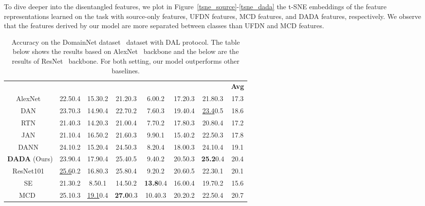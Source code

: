 \documentclass{article}
\newcommand{\BU}[1]{\color{black!40!green}\textbf{#1}}
\newcommand{\BV}[1]{\color{black!10!blue}{\em #1}}
\begin{document}
To dive deeper into the disentangled features, we plot in Figure~\ref{tsne_source}-\ref{tsne_dada} the t-SNE embeddings of the feature representations learned on the {\BV{sv}}{\BV{mm,mt,up,sy}} task with source-only features, UFDN features, MCD features, and DADA features, respectively. We observe that the features derived by our model are more separated between classes than UFDN and MCD features. 







\begin{table*}[t]
\vspace{-0.3cm}
\caption{Accuracy on the DomainNet dataset~\cite{domainnet} dataset with DAL protocol. The table below shows the results based on AlexNet~\cite{alexnet} backbone and the below are the results of ResNet~\cite{resnet} backbone. For both setting, our model outperforms other baselines. } \label{table_lsdac}
\vspace{0.1in}
\centering
\small
{
\begin{tabular}{c c c c c c  c c}
\Xhline{1.0pt}
 & 
\multirow{2}{1.4cm}{\scriptsize{\BV{clpinf,pnt\\qdr,rel,skt}} } &  
\multirow{2}{1.4cm}{\scriptsize{\BV{infclp,pnt,\\qdr,rel,skt}} } & 
\multirow{2}{1.4cm}{\scriptsize{\BV{pntclp,inf,\\qdr,rel,skt}} }& 
\multirow{2}{1.4cm}{\scriptsize{\BV{qdrclp,inf,\\pnt,rel,skt}} }&    
\multirow{2}{1.4cm}{\scriptsize{\BV{relclp,inf,\\pnt,qdr,skt }} } & 
\multirow{2}{1.4cm}{\scriptsize{\BV{sktclp,inf,\\pnt,qdr,rel }} } & 
\multirow{2}{0.5cm}{{\BU{Avg}}} \\ 
&&&&&&& \\




 \Xhline{0.7pt} 
AlexNet~\cite{alexnet}& 22.50.4&15.30.2&21.20.3&6.00.2&17.20.3&21.80.3& 17.3\\
DAN~\cite{long2015} & 23.70.3 & 14.90.4 & 22.70.2 & 7.60.3& 19.40.4&\underline{23.4}0.5 & 18.6 \\
RTN~\cite{RTN} & 21.40.3 & 14.20.3 & 21.00.4 & 7.70.2 & 17.80.3 &20.80.4  &17.2\\
JAN~\cite{JAN} &21.10.4&16.50.2&21.60.3&9.90.1&15.40.2&22.50.3&17.8\\
DANN~\cite{DANN}&24.10.2 & 15.20.4 & 24.50.3 & 8.20.4 & 18.00.3 &  24.10.4 & 19.1 \\
\textbf{DADA} (Ours) &23.90.4 & 17.90.4 & 25.40.5 & 9.40.2 &20.50.3& \textbf{25.2}0.4 & 20.4\\
 \Xhline{1pt} 
 ResNet101~\cite{resnet}& \underline{25.6}0.2 & 16.80.3 & 25.80.4 & 9.20.2 & 20.60.5 & 22.30.1 & 20.1  \\
SE~\cite{SE}&21.30.2&8.50.1 &14.50.2&\textbf{13.8}0.4 &16.00.4&19.70.2 & 15.6  \\
MCD ~\cite{MCD_2018} & 25.10.3 & \underline{19.1}0.4 & \textbf{27.0}0.3 & 10.40.3 & 20.20.2 & 22.50.4 & 20.7  \\


\end{tabular}}
\end{table*}
\end{document}
